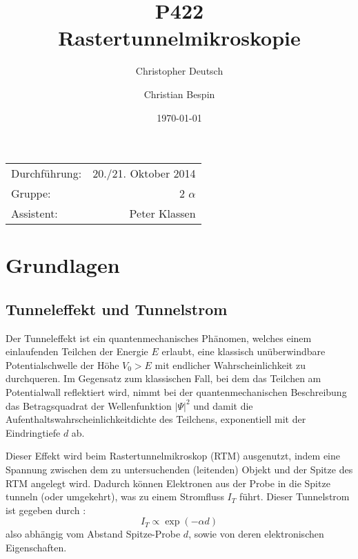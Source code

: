 \documentclass[10pt, a4paper]{article}
\title{P422 \\ Rastertunnelmikroskopie}
\author{Christopher Deutsch \and Christian Bespin}
\date{\today}
\begin{document}
  
\maketitle

\begin{center}
\begin{tabular}{l r}
Durchführung: & 20./21. Oktober 2014 \\
Gruppe: & 2 $\alpha$ \\
Assistent: & Peter Klassen
\end{tabular}
\end{center}

\begin{abstract}
\end{abstract}

\tableofcontents
\newpage

\section{Grundlagen}

\subsection{Tunneleffekt und Tunnelstrom}
Der Tunneleffekt ist ein quantenmechanisches Phänomen, welches einem einlaufenden Teilchen der Energie $E$ erlaubt, eine klassisch unüberwindbare Potentialschwelle der Höhe $V_0 > E$ mit endlicher Wahrscheinlichkeit zu durchqueren.
Im Gegensatz zum klassischen Fall, bei dem das Teilchen am Potentialwall reflektiert wird, nimmt bei der quantenmechanischen Beschreibung das Betragsquadrat der Wellenfunktion $|\Psi|^2$ und damit die Aufenthaltswahrscheinlichkeitdichte des Teilchens, exponentiell mit der Eindringtiefe $d$ ab.

Dieser Effekt wird beim Rastertunnelmikroskop (RTM) ausgenutzt, indem eine Spannung zwischen dem zu untersuchenden (leitenden) Objekt und der Spitze des RTM angelegt wird. Dadurch können Elektronen aus der Probe in die Spitze tunneln (oder umgekehrt), was zu einem Stromfluss $I_T$ führt.
Dieser Tunnelstrom ist gegeben durch \cite{binning}:
\begin{equation}
  I_T \propto \exp(-\alpha d)
\end{equation}
also abhängig vom Abstand Spitze-Probe $d$, sowie von deren elektronischen Eigenschaften.
\end{document}
